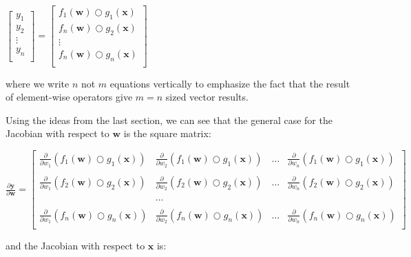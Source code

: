 \documentclass[11pt]{article}
\begin{document}
$\begin{bmatrix}
           y_1\\
           y_2\\
           \vdots \\
           y_n\\
           \end{bmatrix} = \begin{bmatrix}
           f_{1}(\mathbf{w}) \bigcirc g_{1}(\mathbf{x})\\
           f_{n}(\mathbf{w}) \bigcirc g_{2}(\mathbf{x})\\
           \vdots \\
           f_{n}(\mathbf{w}) \bigcirc g_{n}(\mathbf{x})\\
         \end{bmatrix}$

where we write $n$ not $m$ equations vertically to emphasize the fact that the result of element-wise operators give $m=n$ sized vector results.

Using the ideas from the last section, we can see that the general case for the Jacobian with respect to $\mathbf{w}$ is the square matrix:

$
\frac{\partial \mathbf{y}}{\partial \mathbf{w}}  = \begin{bmatrix}
\frac{\partial}{\partial w_1} ( f_{1}(\mathbf{w}) \bigcirc g_{1}(\mathbf{x}) ) & \frac{\partial}{\partial w_2} ( f_{1}(\mathbf{w}) \bigcirc g_{1}(\mathbf{x}) ) & \ldots & \frac{\partial}{\partial w_n} ( f_{1}(\mathbf{w}) \bigcirc g_{1}(\mathbf{x}) )\\\\
\frac{\partial}{\partial w_1} ( f_{2}(\mathbf{w}) \bigcirc g_{2}(\mathbf{x}) ) & \frac{\partial}{\partial w_2} ( f_{2}(\mathbf{w}) \bigcirc g_{2}(\mathbf{x}) ) & \ldots & \frac{\partial}{\partial w_n} ( f_{2}(\mathbf{w}) \bigcirc g_{2}(\mathbf{x}) )\\\\
& \ldots\\\\
\frac{\partial}{\partial w_1} ( f_{n}(\mathbf{w}) \bigcirc g_{n}(\mathbf{x}) ) & \frac{\partial}{\partial w_2} ( f_{n}(\mathbf{w}) \bigcirc g_{n}(\mathbf{x}) ) & \ldots & \frac{\partial}{\partial w_n} ( f_{n}(\mathbf{w}) \bigcirc g_{n}(\mathbf{x}) )\\
\end{bmatrix}
$

and the Jacobian with respect to $\mathbf{x}$ is:
\end{document}

